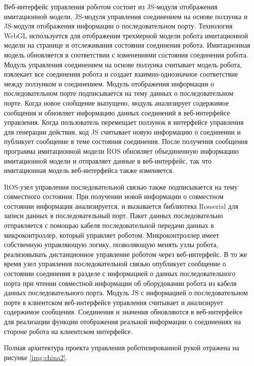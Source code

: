 Веб-интерфейс управления роботом состоит из JS-модуля отображения имитационной модели, JS-модуля управления соединением на основе ползунка и JS-модуля отображения информации о последовательном порту. Технология WebGL используется для отображения трехмерной модели робота имитационной модели на странице и отслеживания состояния соединения робота. Имитационная модель обновляется в соответствии с изменениями состояния соединения робота. Модуль управления соединением на основе ползунка считывает модель робота, извлекает все соединения робота и создает взаимно-однозначное соответствие между ползунком и соединением. Модуль отображения информации о последовательном порте подписывается на тему данных о последовательном порте. Когда новое сообщение выпущено, модуль анализирует содержимое сообщения и обновляет информацию данных соединений в веб-интерфейсе управления. Когда пользователь перемещает ползунок в интерфейсе управления для генерации действия, код JS считывает новую информацию о соединении и публикует сообщение в теме состояния соединения. После получения сообщения программа имитационной модели ROS обновляет объединенную информацию имитационной модели и отправляет данные в веб-интерфейс, так что имитационная модель веб-интерфейса также изменяется.

ROS-узел управления последовательной связью также подписывается на тему совместного состояния. При получении новой информации о совместном состоянии информация анализируется, и вызывается библиотека Rosserial для записи данных в последовательный порт. Пакет данных последовательно отправляется с помощью кабеля последовательной передачи данных в микроконтроллер, который управляет роботом. Микроконтроллер имеет собственную управляющую логику, позволяющую менять узлы робота, реализовывать дистанционное управление роботом через веб-интерфейс. В то же время узел управления последовательной связью опубликует сообщение о состоянии соединения в разделе с информацией о данных последовательного порта при чтении совместной информации об оборудовании робота из кабеля данных последовательного порта. Модуль JS с информацией о последовательном порте в клиентском веб-интерфейсе управления считывает и анализирует содержимое сообщения. Соединения и значения обновляются в веб-интерфейсе для реализации функции отображения реальной информации о соединениях на стороне робота на клиентском интерфейсе.

Полная архитектура проекта управления роботизированной рукой отражена на рисунке \ref{img:china2}.

